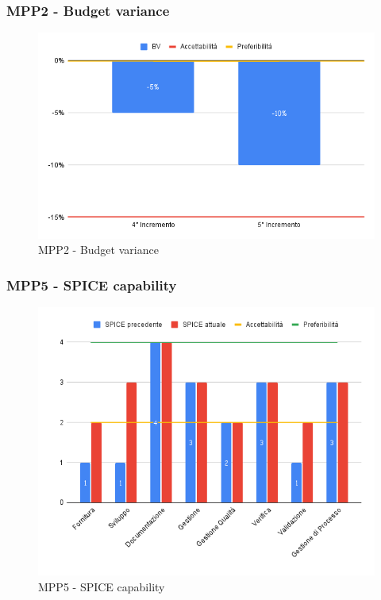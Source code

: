 \subsubsection{MPP2 - Budget variance}

\begin{figure}[H]
	\centering
	\includegraphics[scale = 0.6]{sezioni/Images/PB/BV.png}
	\caption{MPP2 - Budget variance}
\end{figure}

\subsubsection{MPP5 - SPICE capability}

\begin{figure}[H]
	\centering
	\includegraphics[scale = 0.6]{sezioni/Images/PB/SPICE.png}
	\caption{MPP5 - SPICE capability}
\end{figure}

